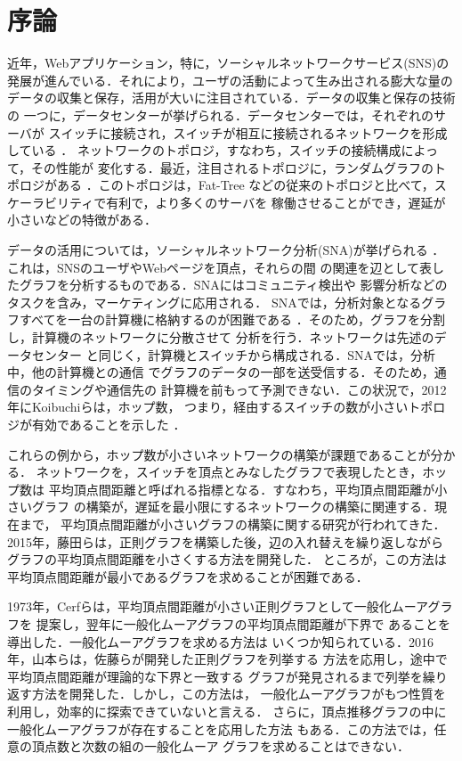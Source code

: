 
\chapter{序論}

近年，Webアプリケーション，特に，ソーシャルネットワークサービス(SNS)の
発展が進んでいる．それにより，ユーザの活動によって生み出される膨大な量の
データの収集と保存，活用が大いに注目されている．データの収集と保存の技術の
一つに，データセンターが挙げられる．データセンターでは，それぞれのサーバが
スイッチに接続され，スイッチが相互に接続されるネットワークを形成している
\cite{Greenberg2009,Al-Fares2008}．
ネットワークのトポロジ，すなわち，スイッチの接続構成によって，その性能が
変化する．最近，注目されるトポロジに，ランダムグラフのトポロジがある
\cite{Singla2011,Koibuchi2012}．このトポロジは，Fat-Tree\cite{Al-Fares2008}
などの従来のトポロジと比べて，スケーラビリティで有利で，より多くのサーバを
稼働させることができ，遅延が小さいなどの特徴がある\cite{Singla2011}．

データの活用については，ソーシャルネットワーク分析(SNA)が挙げられる
\cite{Aggarwal2011}．これは，SNSのユーザやWebページを頂点，それらの間
の関連を辺として表したグラフを分析するものである．SNAにはコミュニティ検出や
影響分析などのタスクを含み，マーケティングに応用される．
SNAでは，分析対象となるグラフすべてを一台の計算機に格納するのが困難である
\cite{Ching2015}．そのため，グラフを分割し，計算機のネットワークに分散させて
分析を行う\cite{Ching2015,Malewicz2010}．ネットワークは先述のデータセンター
と同じく，計算機とスイッチから構成される．SNAでは，分析中，他の計算機との通信
でグラフのデータの一部を送受信する．そのため，通信のタイミングや通信先の
計算機を前もって予測できない．この状況で，2012年にKoibuchiらは，ホップ数，
つまり，経由するスイッチの数が小さいトポロジが有効であることを示した
\cite{Koibuchi2012}．

これらの例から，ホップ数が小さいネットワークの構築が課題であることが分かる．
ネットワークを，スイッチを頂点とみなしたグラフで表現したとき，ホップ数は
平均頂点間距離と呼ばれる指標となる．すなわち，平均頂点間距離が小さいグラフ
の構築が，遅延を最小限にするネットワークの構築に関連する．現在まで，
平均頂点間距離が小さいグラフの構築に関する研究が行われてきた．
2015年，藤田らは，正則グラフを構築した後，辺の入れ替えを繰り返しながら
グラフの平均頂点間距離を小さくする方法を開発した\cite{Fujita2015}．
ところが，この方法は平均頂点間距離が最小であるグラフを求めることが困難である．

1973年，Cerfらは，平均頂点間距離が小さい正則グラフとして一般化ムーアグラフを
提案し\cite{Cerf1973}，翌年に一般化ムーアグラフの平均頂点間距離が下界で
あることを導出した\cite{Cerf1974Lower}．一般化ムーアグラフを求める方法は
いくつか知られている．2016年，山本らは，佐藤らが開発した正則グラフを列挙する
方法\cite{Sato2008}を応用し，途中で平均頂点間距離が理論的な下界と一致する
グラフが発見されるまで列挙を繰り返す方法を開発した．しかし，この方法は，
一般化ムーアグラフがもつ性質を利用し，効率的に探索できていないと言える．
さらに，頂点推移グラフの中に一般化ムーアグラフが存在することを応用した方法
もある\cite{Sampels2004}．この方法では，任意の頂点数と次数の組の一般化ムーア
グラフを求めることはできない．

